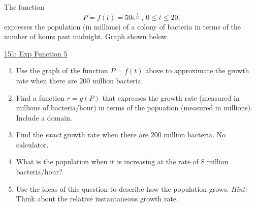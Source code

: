 \documentclass{ximera}
\begin{document}
\begin{question} \label{Q677543345}
The function 
\[
     P = f(t) = 50 e^{\frac{t}{10}} \, , \, 0\leq t \leq 20 ,
\]
expresses the population (in millions) of a colony of bacteria in terms of the number of hours past  midnight. Graph shown below.

\begin{onlineOnly}
    \begin{center}
\end{center}
\end{onlineOnly}

\href{https://www.desmos.com/calculator/kffjsoepmo}{151: Exp Function 5}


\begin{enumerate}

\item Use the graph of the function $P=f(t)$ above to approximate the growth rate when there are $200$ million bacteria.

\item Find a function $r=g(P)$ that expresses the growth rate (measured in millions of bacteria/hour) in terms of the popuation (measured in millions). Include a domain.

\item Find the \emph{exact} growth rate when there are $200$ million bacteria. No calculator.

\item What is the population when it is increasing at the rate of $8$ million bacteria/hour?

\item Use the ideas of this question to describe how the population grows. \emph{Hint:} Think about the relative instantaneous growth rate.

\end{enumerate}
\end{question}
\end{document}
